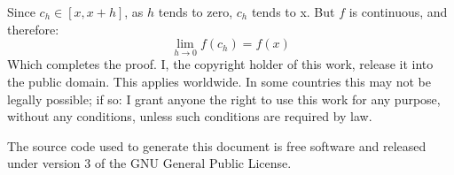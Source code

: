 \documentclass{article}
\theoremstyle{normal}
\theoremstyle{plain}
\begin{document}
    Since $c_{h}\in[x,x+h]$, as $h$ tends to zero, $c_{h}$ tends to x.
    But $f$ is continuous, and therefore:
    \begin{equation}
        \lim_{h\rightarrow{0}}f(c_{h})=f(x)
    \end{equation}
    Which completes the proof.
    \newpage
    I, the copyright holder of this work, release it into the public domain.
    This applies worldwide. In some countries this may not be legally possible;
    if so: I grant anyone the right to use this work for any purpose, without
    any conditions, unless such conditions are required by law.
    \par\hfill\par
    The source code used to generate this document is free software and released
    under version 3 of the GNU General Public License.
\end{document}
